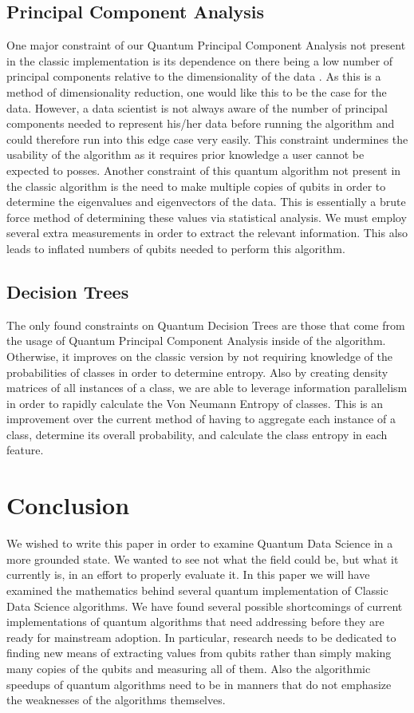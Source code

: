 \documentclass[conference]{IEEEtran}
\begin{document}
\subsection{Principal Component Analysis}
One major constraint of our Quantum Principal Component Analysis not present in the classic implementation is its dependence on there being a low number of principal components relative to the dimensionality of the data \cite{b6}. As this is a method of dimensionality reduction, one would like this to be the case for the data. However, a data scientist is not always aware of the number of principal components needed to represent his/her data before running the algorithm and could therefore run into this edge case very easily. This constraint undermines the usability of the algorithm as it requires prior knowledge a user cannot be expected to posses. \newline
\indent Another constraint of this quantum algorithm not present in the classic algorithm is the need to make multiple copies of qubits in order to determine the eigenvalues and eigenvectors of the data. This is essentially a brute force method of determining these values via statistical analysis. We must employ several extra measurements in order to extract the relevant information. This also leads to inflated numbers of qubits needed to perform this algorithm.  
\subsection{Decision Trees}
The only found constraints on Quantum Decision Trees are those that come from the usage of Quantum Principal Component Analysis inside of the algorithm. Otherwise, it improves on the classic version by not requiring knowledge of the probabilities of classes in order to determine entropy. Also by creating density matrices of all instances of a class, we are able to leverage information parallelism in order to rapidly calculate the Von Neumann Entropy of classes. This is an improvement over the current method of having to aggregate each instance of a class, determine its overall probability, and calculate the class entropy in each feature. 

\section{Conclusion}
We wished to write this paper in order to examine Quantum Data Science in a more grounded state. We wanted to see not what the field could be, but what it currently is, in an effort to properly evaluate it. In this paper we will have examined the mathematics behind several quantum implementation of Classic Data Science algorithms. We have found several possible shortcomings of current implementations of quantum algorithms that need addressing before they are ready for mainstream adoption. In particular, research needs to be dedicated to finding new means of extracting values from qubits rather than simply making many copies of the qubits and measuring all of them. Also the algorithmic speedups of quantum algorithms need to be in manners that do not emphasize the weaknesses of the algorithms themselves.   
\end{document}
